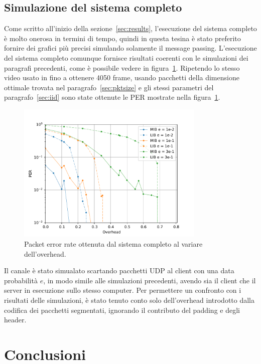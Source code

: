 \documentclass[italian, a4paper, 12pt]{article}
\begin{document}
\subsection{Simulazione del sistema completo}
Come scritto all'inizio della sezione~\ref{sec:results}, l'esecuzione
del sistema completo è molto onerosa in termini di tempo, quindi in
questa tesina è stato preferito fornire dei grafici più precisi
simulando solamente il message passing.
%
L'esecuzione del sistema completo comunque fornisce risultati coerenti
con le simulazioni dei paragrafi precedenti, come è possibile vedere
in figura~\ref{fig:iid_real}.
%
Ripetendo lo stesso video usato in \cite{uep} fino a ottenere 4050
frame, usando pacchetti della dimensione ottimale trovata nel
paragrafo~\ref{sec:pktsize} e gli stessi parametri del
paragrafo~\ref{sec:iid} sono state ottenute le PER mostrate nella
figura~\ref{fig:iid_real}.
%
\begin{figure}[htb]
  \centering
  \includegraphics[width=0.8\textwidth]{plot_iid_real}
  \caption{Packet error rate ottenuta dal sistema completo al variare
    dell'overhead.}
  \label{fig:iid_real}
\end{figure}
%
Il canale è stato simualato scartando pacchetti UDP al client con una
data probabilità $e$, in modo simile alle simulazioni precedenti,
avendo sia il client che il server in esecuzione sullo stesso
computer.
%
Per permettere un confronto con i risultati delle simulazioni, è stato
tenuto conto solo dell'overhead introdotto dalla codifica dei
pacchetti segmentati, ignorando il contributo del padding e degli
header.

\newpage
\section{Conclusioni} %



\printbibliography[heading=bibnumbered, title=Bibliografia]
\end{document}
